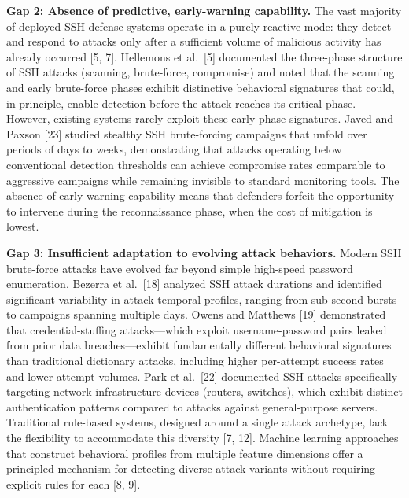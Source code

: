 \documentclass[
  a4paper]{report}
\begin{document}
\textbf{Gap 2: Absence of predictive, early-warning capability.} The
vast majority of deployed SSH defense systems operate in a purely
reactive mode: they detect and respond to attacks only after a
sufficient volume of malicious activity has already occurred {[}5, 7{]}.
Hellemons et al.~{[}5{]} documented the three-phase structure of SSH
attacks (scanning, brute-force, compromise) and noted that the scanning
and early brute-force phases exhibit distinctive behavioral signatures
that could, in principle, enable detection before the attack reaches its
critical phase. However, existing systems rarely exploit these
early-phase signatures. Javed and Paxson {[}23{]} studied stealthy SSH
brute-forcing campaigns that unfold over periods of days to weeks,
demonstrating that attacks operating below conventional detection
thresholds can achieve compromise rates comparable to aggressive
campaigns while remaining invisible to standard monitoring tools. The
absence of early-warning capability means that defenders forfeit the
opportunity to intervene during the reconnaissance phase, when the cost
of mitigation is lowest.

\textbf{Gap 3: Insufficient adaptation to evolving attack behaviors.}
Modern SSH brute-force attacks have evolved far beyond simple high-speed
password enumeration. Bezerra et al.~{[}18{]} analyzed SSH attack
durations and identified significant variability in attack temporal
profiles, ranging from sub-second bursts to campaigns spanning multiple
days. Owens and Matthews {[}19{]} demonstrated that credential-stuffing
attacks---which exploit username-password pairs leaked from prior data
breaches---exhibit fundamentally different behavioral signatures than
traditional dictionary attacks, including higher per-attempt success
rates and lower attempt volumes. Park et al.~{[}22{]} documented SSH
attacks specifically targeting network infrastructure devices (routers,
switches), which exhibit distinct authentication patterns compared to
attacks against general-purpose servers. Traditional rule-based systems,
designed around a single attack archetype, lack the flexibility to
accommodate this diversity {[}7, 12{]}. Machine learning approaches that
construct behavioral profiles from multiple feature dimensions offer a
principled mechanism for detecting diverse attack variants without
requiring explicit rules for each {[}8, 9{]}.
\end{document}
